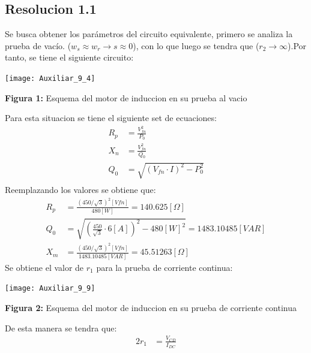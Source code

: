 \documentclass[
  11pt,
  letterpaper,
   addpoints,
   answers
  ]{exam}
\begin{document}
\begin{questions}
    \begin{solution}
        \subsection*{Resolucion 1.1}
        Se busca obtener los parámetros del circuito equivalente, primero se analiza la prueba de vacío. ($w_{s} \approx w_{r} \rightarrow s\approx 0$), con lo que luego se tendra que ($r_{2} \rightarrow \infty$).Por tanto, se tiene el siguiente circuito:
        \begin{center}
            \texttt{[image: Auxiliar\_9\_4]}
        \end{center}
        \begin{center}
            \textbf{Figura 1:} Esquema del motor de induccion en su prueba al vacio
        \end{center}
        Para esta situacion se tiene el siguiente set de ecuaciones:
        \begin{align}
            R_{p} &= \frac{V_{fn}^{2}}{P_{0}}\\
            X_{n} &= \frac{V_{fn}^{2}}{Q_{0}}\\
            Q_{0} &= \sqrt{(V_{fn} \cdot I)^{2} - P_{0}^{2}}\\
        \end{align}
        Reemplazando los valores se obtiene que:
        \begin{align}
            R_{p} &= \frac{(450/ \sqrt{3})^{2}[Vfn]}{480[W]} = 140.625[\Omega]\\
            Q_{0} &= \sqrt{\left(\frac{450}{\sqrt{3}} \cdot 6[A]\right)^{2} - 480[W]^{2}} = 1483.10485[VAR]\\
            X_{m} &= \frac{(45 0/\sqrt{3})^{2}[Vfn]}{1483.10485[VAR]} = 45.51263[\Omega]
        \end{align}
        Se obtiene el valor de $r_{1}$ para la prueba de corriente continua:
        \begin{center}
            \texttt{[image: Auxiliar\_9\_9]}
        \end{center}
        \begin{center}
            \textbf{Figura 2:} Esquema del motor de induccion en su prueba de corriente continua
        \end{center}
        De esta manera se tendra que:
        \begin{align}
            2r_{1} &= \frac{V_{CD}}{I_{DC}}\\

\end{align}
\end{solution}
\end{questions}
\end{document}
